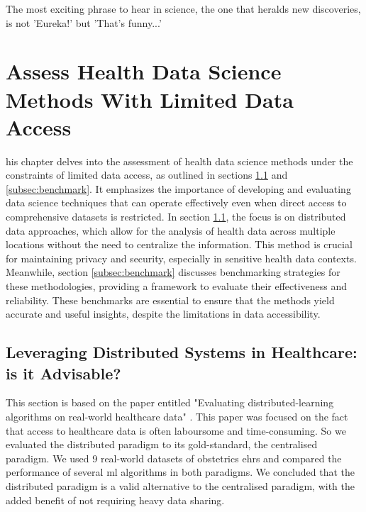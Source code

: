 
\begin{savequote}[75mm]
    The most exciting phrase to hear in science, the one that heralds new discoveries, is not 'Eureka!' but 'That's funny...'
    \end{savequote}

\chapter{Assess Health Data Science Methods With Limited Data Access}\label{chap:goal2}
his chapter delves into the assessment of health data science methods under the constraints of limited data access, as outlined in sections \ref{subsec:distributed} and \ref{subsec:benchmark}. It emphasizes the importance of developing and evaluating data science techniques that can operate effectively even when direct access to comprehensive datasets is restricted. In section \ref{subsec:distributed}, the focus is on distributed data approaches, which allow for the analysis of health data across multiple locations without the need to centralize the information. This method is crucial for maintaining privacy and security, especially in sensitive health data contexts. Meanwhile, section \ref{subsec:benchmark} discusses benchmarking strategies for these methodologies, providing a framework to evaluate their effectiveness and reliability. These benchmarks are essential to ensure that the methods yield accurate and useful insights, despite the limitations in data accessibility.


\section{Leveraging Distributed Systems in Healthcare: is it Advisable?}\label{subsec:distributed}
This section is based on the paper entitled "Evaluating distributed-learning algorithms on real-world healthcare data" \cite{coutinho-almeidaEvaluatingDistributedlearningRealworld2024}. This paper was focused on the fact that access to healthcare data is often laboursome and time-consuming. So we evaluated the distributed paradigm to its gold-standard, the centralised paradigm. We used 9 real-world datasets of obstetrics \acp{ehr} and compared the performance of several \ac{ml} algorithms in both paradigms. We concluded that the distributed paradigm is a valid alternative to the centralised paradigm, with the added benefit of not requiring heavy data sharing.


